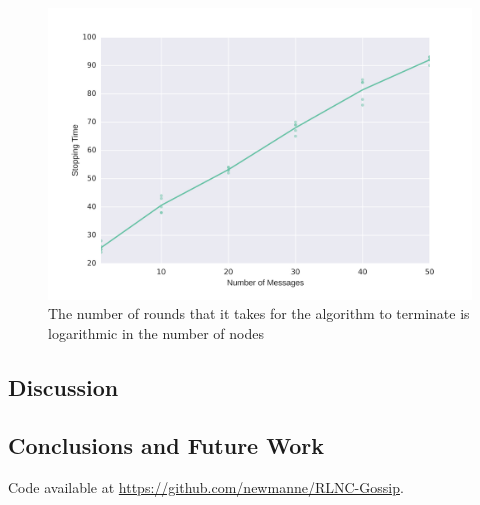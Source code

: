 \documentclass{article} %
\begin{document}
\begin{figure}
\centering
\includegraphics[width=\linewidth]{figures/rlnc-vary-n.png}
\caption{The number of rounds that it takes for the algorithm to terminate is logarithmic in the number of nodes}
\label{fig:rlnc-vary-n}
\end{figure} 


\subsection{Discussion}

\subsection{Conclusions and Future Work}
Code available at \url{https://github.com/newmanne/RLNC-Gossip}.

\nocite{*}





\end{document}
